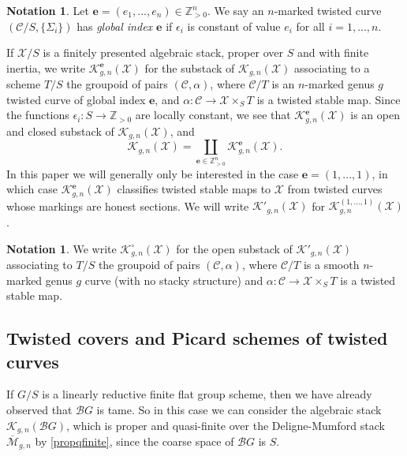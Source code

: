 \documentclass[11pt]{amsart}
\theoremstyle{definition}
\newtheorem{notation}[subsection]{Notation}
\begin{document}
\begin{notation}\label{globalindex}
Let $\mathbf{e} = (e_1,...,e_n) \in \mathbb{Z}^n_{>0}$. We say an $n$-marked twisted curve $({\mathcal{C}}/S,\{\Sigma_i\})$ has \textit{global index $\mathbf{e}$} if $\epsilon_i$ is constant of value $e_i$ for all $i = 1,...,n$.

If ${\mathcal{X}}/S$ is a finitely presented algebraic stack, proper over $S$ and with finite inertia, we write ${\mathcal{K}}^{\mathbf{e}}_{g,n}({\mathcal{X}})$ for the substack of ${\mathcal{K}}_{g,n}({\mathcal{X}})$ associating to a scheme $T/S$ the groupoid of pairs $({\mathcal{C}},\alpha)$, where ${\mathcal{C}}/T$ is an $n$-marked genus $g$ twisted curve of global index $\mathbf{e}$, and $\alpha: {\mathcal{C}} \rightarrow {\mathcal{X}} \times_S T$ is a twisted stable map. Since the functions $\epsilon_i: S \rightarrow \mathbb{Z}_{>0}$ are locally constant, we see that ${\mathcal{K}}^{\mathbf{e}}_{g,n}({\mathcal{X}})$ is an open and closed substack of ${\mathcal{K}}_{g,n}({\mathcal{X}})$, and 
\begin{displaymath}
{\mathcal{K}}_{g,n}({\mathcal{X}}) = \coprod_{\mathbf{e} \in \mathbb{Z}^n_{>0}} {\mathcal{K}}^{\mathbf{e}}_{g,n}({\mathcal{X}}).
\end{displaymath}
In this paper we will generally only be interested in the case $\mathbf{e} = (1,...,1)$, in which case ${\mathcal{K}}^{\mathbf{e}}_{g,n}({\mathcal{X}})$ classifies twisted stable maps to ${\mathcal{X}}$ from twisted curves whose markings are honest sections. We will write ${\mathcal{K}}'_{g,n}({\mathcal{X}})$ for ${\mathcal{K}}^{(1,...,1)}_{g,n}({\mathcal{X}})$.
\end{notation}

\begin{notation}
We write ${\mathcal{K}}_{g,n}^\circ({\mathcal{X}})$ for the open substack of ${\mathcal{K}}'_{g,n}({\mathcal{X}})$ associating to $T/S$ the groupoid of pairs $({\mathcal{C}},\alpha)$, where ${\mathcal{C}}/T$ is a smooth $n$-marked genus $g$ curve (with no stacky structure) and $\alpha: {\mathcal{C}} \rightarrow {\mathcal{X}} \times_S T$ is a twisted stable map. 
\end{notation}

\subsection*{Twisted covers and Picard schemes of twisted curves}

If $G/S$ is a linearly reductive finite flat group scheme, then we have already observed that ${\mathcal{B}} G$ is tame. So in this case we can consider the algebraic stack ${\mathcal{K}}_{g,n}({\mathcal{B}} G)$, which is proper and quasi-finite over the Deligne-Mumford stack $\overline{\mathcal{M}}_{g,n}$ by \ref{propqfinite}, since the coarse space of ${\mathcal{B}} G$ is $S$. 
\end{document}
